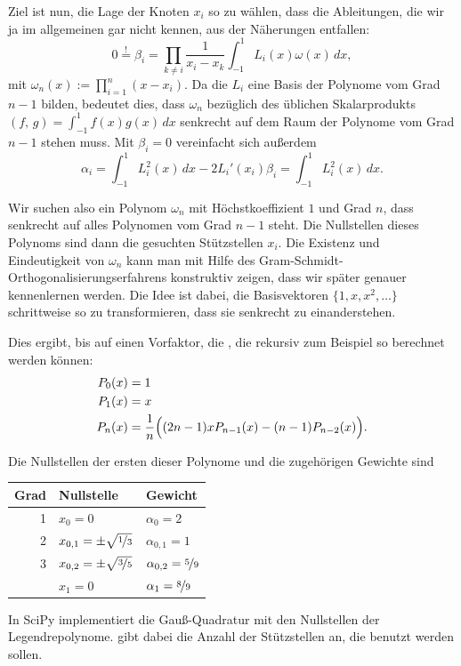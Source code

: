 \noindent Ziel ist nun, die Lage der Knoten $x_i$ so zu wählen, dass
die Ableitungen, die wir ja im allgemeinen gar nicht kennen, aus der
Näherungen entfallen:
\begin{equation}
  \label{eq:gaussortho}
  0 \stackrel{!}{=} \beta_i = \prod_{k\neq i}\frac{1}{x_i-x_k}
  \int_{-1}^1 L_i(x)\omega(x)\, dx,
\end{equation}
mit $\omega_n(x):=\prod_{i=1}^n(x-x_i)$. Da die $L_i$ eine Basis der
Polynome vom Grad $n-1$ bilden, bedeutet dies, dass $\omega_n$
bezüglich des üblichen Skalarprodukts $(f,\,g) = \int_{-1}^1
f(x)g(x)\,dx$ senkrecht auf dem Raum der Polynome vom Grad $n-1$
stehen muss. Mit $\beta_i=0$ vereinfacht sich außerdem
\begin{equation}
  \alpha_i = \int_{-1}^1 L_i^2(x)\,dx - 2L_i'(x_i)\beta_i
  = \int_{-1}^1 L_i^2(x)\, dx.
\end{equation}

Wir suchen also ein Polynom $\omega_n$ mit Höchstkoeffizient $1$ und
Grad $n$, dass senkrecht auf alles Polynomen vom Grad $n-1$ steht. Die
Nullstellen dieses Polynoms sind dann die gesuchten Stützstellen
$x_i$.  Die Existenz und Eindeutigkeit von $\omega_n$ kann man mit
Hilfe des Gram-Schmidt-Orthogonalisierungserfahrens konstruktiv
zeigen, dass wir später genauer kennenlernen werden. Die Idee ist
dabei, die Basisvektoren $\{1, x, x^2,\ldots\}$ schrittweise so zu
transformieren, dass sie senkrecht zu einanderstehen.

Dies ergibt, bis auf einen Vorfaktor, die
\emph{}, die rekursiv zum Beispiel so
berechnet werden können:
\begin{align}
  P_0(x) &= 1\nonumber\\
  P_1(x) &= x\nonumber\\
  P_n(x) &= \frac{1}{n}\Bigl((2n-1)xP_{n-1}(x) -
    (n-1)P_{n-2}(x)\Bigr).
\end{align}
{\samepage Die Nullstellen der ersten dieser Polynome und die
zugehörigen Gewichte sind
\begin{center}
  \renewcommand{\arraystretch}{1.2}
  \begin{tabular}{r|l|l}
    Grad & Nullstelle & Gewicht\\
    \hline\hline
    1    & $x_0=0$         & $\alpha_0=2$\\
    \hline
    2    & $x_{0,1} = \pm \sqrt{\nicefrac{1}{3}}$ &
    $\alpha_{0,1} = 1$ \\
    \hline
    3    & $x_{0,2} =  \pm \sqrt{\nicefrac{3}{5}}$ &
    $\alpha_{0,2}=\nicefrac{5}{9}$\\
    {}   & $x_1 =  0$                             &
    $\alpha_1=\nicefrac{8}{9}$\\
  \end{tabular}
\end{center}}
In SciPy implementiert  die Gauß-Quadratur mit den Nullstellen der
Legendrepolynome.  gibt dabei die Anzahl der Stützstellen an,
die benutzt werden sollen.

